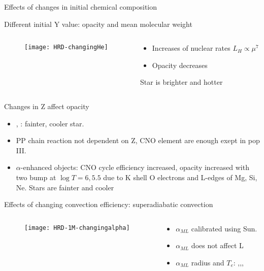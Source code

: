 \begin{frame}{Effects of changes in initial chemical composition}
\begin{block}{Different initial Y value: opacity and mean molecular weight}
\begin{columns}[T]
\begin{column}{0.5\textwidth}
\begin{figure}[!ht]\texttt{[image: HRD-changingHe]}\label{fig:HRD-changingHe}
\end{figure}
\end{column}
\begin{column}{0.5\textwidth}
\begin{itemize}
    \item Increases of nuclear rates $L_H\propto\mu^7$
    \item Opacity decreases
\end{itemize}
Star is brighter and hotter
\end{column}
\end{columns}
\end{block}
\begin{block}{Changes in Z affect opacity}
\begin{itemize}
    \item {}, \xaumenta{\kappa}: fainter, cooler star.
    \item PP chain reaction not dependent on Z, CNO element are enough exept in pop III.
    \item $\alpha$-enhanced objects: CNO cycle efficiency increased, opacity increased with two bump at $\log{T}=6,5.5$ due to K shell O electrons and L-edges of Mg, Si, Ne. Stars are fainter and cooler
\end{itemize}
\end{block}
\end{frame}

\begin{frame}{Effects of changing convection efficiency: superadiabatic convection}
\begin{columns}[T]
\begin{column}{0.5\textwidth}
\begin{figure}[!ht]\texttt{[image: HRD-1M-changingalpha]}\label{fig:HRD-changingHe}
\end{figure}
\end{column}
\begin{column}{0.5\textwidth}
\begin{itemize}
    \item $\alpha_{ML}$ calibrated using Sun.
    \item $\alpha_{ML}$ does not affect L
    \item $\alpha_{ML}$ radius and $T_e$: \xaumenta{\alpha},\xdiminuisce{\nabla},,
\end{itemize}
\end{column}
\end{columns}
\end{frame}

